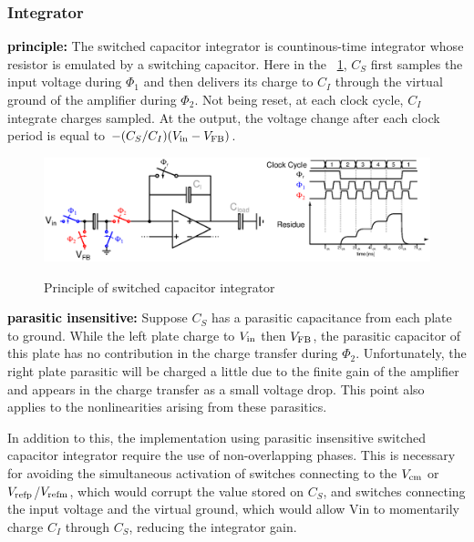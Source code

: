 	\subsubsection{Integrator}              %
\textbf{\textcolor{black}{principle:}}
The switched capacitor integrator is countinous-time integrator whose resistor is emulated by a switching capacitor. Here in the \figurename~\ref{fig:sigma-delta-integration}, $C_S$ first samples the input voltage during $\Phi_1$ and then delivers its charge to $C_I$ through the virtual ground of the amplifier during $\Phi_2$. Not being reset, at each clock cycle, $C_I$ integrate charges sampled. At the output, the voltage change after each clock period is equal to $-(C_S/C_I)(V_{\rm in} - V_{\rm FB})$.

\begin{figure}[htp]
	\centering
	\includegraphics[width=\textwidth]{Chapter4/Figs/sigma-delta-integration.ps}
	\begin{subfigure}[b]{0.48\textwidth}
		\centering
	\end{subfigure}
	\begin{subfigure}[b]{0.48\textwidth}
		\centering
	\end{subfigure}
	\caption{Principle of switched capacitor integrator}
	\label{fig:sigma-delta-integration}
\end{figure}

\textbf{\textcolor{black}{parasitic insensitive:}}
Suppose $C_S$ has a parasitic capacitance from each plate to ground. While the left plate charge to $V_{\rm in}$ then $V_{\rm FB}$, the parasitic capacitor of this plate has no contribution in the charge transfer during $\Phi_2$. Unfortunately, the right plate parasitic will be charged a little due to the finite gain of the amplifier and appears in the charge transfer as a small voltage drop. This point also applies to the nonlinearities arising from these parasitics.

In addition to this, the implementation using parasitic insensitive switched capacitor integrator require the use of non-overlapping phases. This is necessary for avoiding the simultaneous activation of switches connecting to the $V_{\rm cm}$ or $V_{\rm refp}$/$V_{\rm refm}$, which would corrupt the value stored on $C_S$, and
switches connecting the input voltage and the virtual ground, which would allow Vin to momentarily charge $C_I$ through $C_S$, reducing the integrator gain. 

